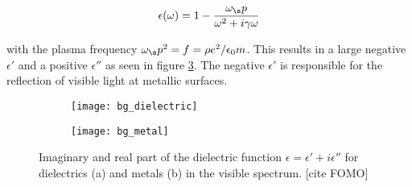 \begin{equation}
    \epsilon(\omega) = 1 - \frac{\omega_\s p}{\omega^2 + i \gamma \omega}
\end{equation}

with the plasma frequency 
$\omega_\s p^2 = f = \rho e^2 / \epsilon_0 m$.
This results in a large negative $\epsilon'$ and a positive $\epsilon''$ as seen in figure \ref{fig:bg:metal}. The negative $\epsilon'$ is responsible for the reflection of visible light at metallic surfaces.

\begin{figure}[H]
\centering
\begin{subfigure}{.5\textwidth}
    \centering
    \texttt{[image: bg\_dielectric]}
    \caption{}
    \label{fig:bg:dielectric}
\end{subfigure}%
\begin{subfigure}{.5\textwidth}
    \centering
    \texttt{[image: bg\_metal]}
    \caption{}
    \label{fig:bg:metal}
\end{subfigure}
\caption{Imaginary and real part of the dielectric function 
$\epsilon = \epsilon' + i \epsilon''$
for dielectrics (a) and metals (b) in the visible spectrum.
[cite FOMO]}
\end{figure}